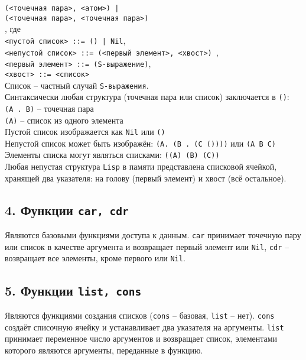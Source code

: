 {\texttt{(<точечная пара>, <атом>) |}}\\

{\texttt{(<точечная пара>, <точечная пара>)}}\\


, где\\

{\texttt{<пустой список> ::= () | Nil}},\\

{\texttt{<непустой список> ::= (<первый элемент>, <хвост>) }},\\

{\texttt{<первый элемент> ::= (S-выражение)}},\\

{\texttt{<хвост> ::= <список>}}\\


\noindent Список -- частный случай {\texttt{S-выражения}}.\\

Синтаксически любая структура (точечная пара или список) заключается в {\texttt{()}}:\\

{\texttt{(A . B)}} -- точечная пара\\

{\texttt{(A)}} -- список из одного элемента\\

Пустой список изображается как {\texttt{Nil}} или {\texttt{()}}\\

Непустой список может быть изображён: {\texttt{(A. (B . (C ())))}} или {\texttt{(A B C)}}\\

Элементы списка могут являться списками: {\texttt{((A) (B) (C))}}\\

Любая непустая структура {\texttt{Lisp}} в памяти представлена списковой ячейкой, хранящей два указателя: на голову (первый элемент) и хвост (всё остальное).


\subsection*{4. Функции {\texttt{car, cdr}}}

Являются базовыми функциями доступа к данным. {\texttt{car}} принимает точечную пару или список в качестве аргумента и возвращает первый элемент или {\texttt{Nil}}, {\texttt{cdr}} -- возвращает все элементы, кроме первого или {\texttt{Nil}}.

\subsection*{5. Функции {\texttt{list, cons}}}

Являются функциями создания списков ({\texttt{cons}} -- базовая, {\texttt{list}} -- нет). {\texttt{cons}} создаёт списочную ячейку и устанавливает два указателя на аргументы. {\texttt{list}} принимает переменное число аргументов и возвращает список, элементами которого являются аргументы, переданные в функцию.